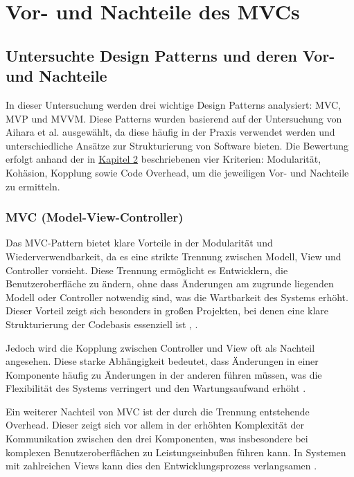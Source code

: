 \chapter{Vor- und Nachteile des MVCs}


\section{Untersuchte Design Patterns und deren Vor- und Nachteile}

In dieser Untersuchung werden drei wichtige Design Patterns analysiert: MVC, MVP und MVVM. Diese Patterns wurden basierend auf der Untersuchung von Aihara et al. \cite{aihara2012mvc} ausgewählt, da diese häufig in der Praxis verwendet werden und unterschiedliche Ansätze zur Strukturierung von Software bieten. Die Bewertung erfolgt anhand der in \hyperref      [chap:methodik]{Kapitel 2} beschriebenen vier Kriterien: Modularität, Kohäsion, Kopplung sowie Code Overhead, um die jeweiligen Vor- und Nachteile zu ermitteln.

\subsection{MVC (Model-View-Controller)}

Das MVC-Pattern bietet klare Vorteile in der Modularität und 
Wiederverwendbarkeit, da es eine strikte Trennung zwischen 
Modell, View und Controller vorsieht. Diese Trennung ermöglicht 
es Entwicklern, die Benutzeroberfläche zu ändern, ohne dass 
Änderungen am zugrunde liegenden Modell oder Controller 
notwendig sind, was die Wartbarkeit des Systems erhöht. 
Dieser Vorteil zeigt sich besonders in großen Projekten, bei denen 
eine klare Strukturierung der Codebasis essenziell ist \cite{eudl63}, 
\cite{researchgate65}.

Jedoch wird die Kopplung zwischen Controller und View oft als 
Nachteil angesehen. Diese starke Abhängigkeit bedeutet, dass 
Änderungen in einer Komponente häufig zu Änderungen in der 
anderen führen müssen, was die Flexibilität des Systems verringert 
und den Wartungsaufwand erhöht \cite{researchgate65}.

Ein weiterer Nachteil von MVC ist der durch die Trennung 
entstehende Overhead. Dieser zeigt sich vor allem in der 
erhöhten Komplexität der Kommunikation zwischen den drei 
Komponenten, was insbesondere bei komplexen 
Benutzeroberflächen zu Leistungseinbußen führen kann. In 
Systemen mit zahlreichen Views kann dies den Entwicklungsprozess 
verlangsamen \cite{eudl63}.

